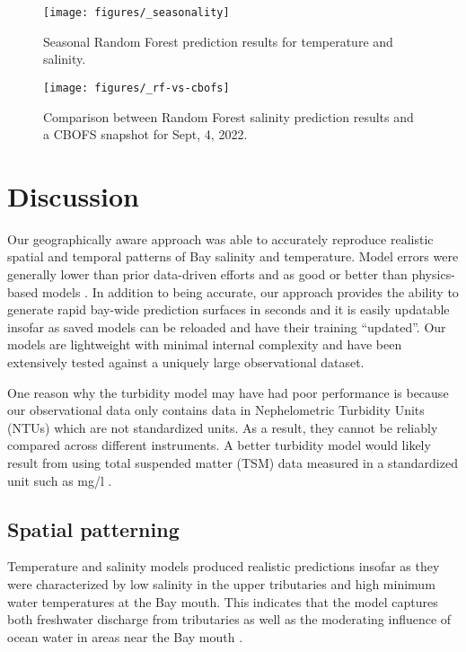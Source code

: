 \documentclass{article}
\begin{document}
\begin{figure}[ht!]
    \begin{center}
          \texttt{[image: figures/\_seasonality]}
          \caption{Seasonal Random Forest prediction results for temperature and salinity.}
    \end{center}    
\end{figure}

\begin{figure}[ht!]
    \begin{center}
          \texttt{[image: figures/\_rf-vs-cbofs]}
          \caption{Comparison between Random Forest salinity prediction results and a CBOFS snapshot for Sept, 4, 2022.}
    \end{center}    
\end{figure}

\section{Discussion}

Our geographically aware approach was able to accurately reproduce realistic spatial and temporal patterns of Bay salinity and temperature. Model errors were generally lower than prior data-driven efforts and as good or better than physics-based models \citep{vogelAssessingSatelliteSea2016}. In addition to being accurate, our approach provides the ability to generate rapid bay-wide prediction surfaces in seconds and it is easily updatable insofar as saved models can be reloaded and have their training “updated”. Our models are lightweight with minimal internal complexity and have been extensively tested against a uniquely large observational dataset.

One reason why the turbidity model may have had poor performance is because our observational data only contains data in Nephelometric Turbidity Units (NTUs) which are not standardized units. As a result, they cannot be reliably compared across different instruments. A better turbidity model would likely result from using total suspended matter (TSM) data measured in a standardized unit such as mg/l \citep{ondrusekDevelopmentNewOptical2012}.

\subsection{Spatial patterning}

Temperature and salinity models produced realistic predictions insofar as they were characterized by low salinity in the upper tributaries and high minimum water temperatures at the Bay mouth. This indicates that the model captures both freshwater discharge from tributaries as well as the moderating influence of ocean water in areas near the Bay mouth \citep{dingSpatiotemporalPatternsWater2015}.
\end{document}
